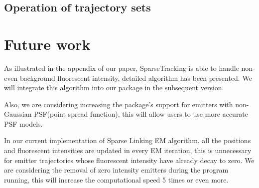 \documentclass[a4paper]{article}
\begin{document}
\begin{CJK*}{UTF8}{kai}
\subsection{Operation of trajectory sets}


\section{Future work}

As illustrated in the appendix of our paper, SparseTracking is able to handle non-even background fluorescent intensity, detailed algorithm has been presented. We will integrate this algorithm into our package in the subsequent version.

Also, we are considering increasing the package's support for emitters with non-Gaussian PSF(point spread function), this will allow users to use more accurate PSF models.

In our current implementation of Sparse Linking EM algorithm, all the positions and fluorescent intensities are updated in every EM iteration, this is unnecessary for emitter trajectories whose fluorescent intensity have already decay to zero. We are considering the removal of zero intensity emitters during the program running, this will increase the computational speed 5 times or even more.

\end{CJK*}
\end{document}

